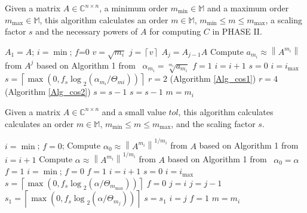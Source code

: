 \begin{algorithm}[!ht]
\caption{Given a matrix $A \in {\mathbb{C}^{n \times n}}$, a minimum order $m_{\min}\in\mathbb{M}$ and a maximum order $m_{\max}\in\mathbb{M}$, this algorithm calculates an order $m\in\mathbb{M}$, $m_{\min}\le m\le m_{\max}$, a scaling factor $s$  and the necessary powers of $A$ for computing $C$ in PHASE II.}
\label{ms-2}
\begin{algorithmic} [1]
\State $A_1=A$; $i=\min$; $f$=0
    \State $v=\sqrt {m_{i}}$
    \State $j=\left\lceil v\right\rceil$
        \State $A_j=A_{j-1}A$ 
    \EndIf
    \State Compute ${a_{m_{i}}} \approx {\left\| {{A^{m_i}}} \right\|}$ from $A^{j}$  \Comment based on Algorithm 1  from~\cite{High88} 
    \State ${\alpha _{{m_i}}} = \sqrt[{{m_i}}]{{{a_{{m_i}}}}}$
        \State $f=1$ 
    \Else
         \State $i=i+1$
    \EndIf
\EndWhile
{}
    \State $s=0$
\Else
    \State $i=i_{\max}$
    \State $s = \left\lceil {\max \left( {0,{{f_s\log }_2}({\alpha_{m_{i}}}/{\Theta_{mi}})} \right)} \right\rceil $ 
 \Comment $r=2$ (Algorithm \ref{Alg_cos1})
 \State \Comment  $r=4$ (Algorithm \ref{Alg_cos2}) 
    \State $s=s-1$
       \State $s=s-1$
    \EndIf 
\EndIf
\EndIf
\State $m=m_i$    
\end{algorithmic}
\end{algorithm}

\begin{algorithm}[!ht]
\caption{Given a matrix $A \in {\mathbb{C}^{n \times n}}$ and a  small value $tol$, this algorithm calculates  calculates an order $m\in\mathbb{M}$, $m_{\min}\le m\le m_{\max}$, and the scaling factor $s$.}
\label{ms-3}
\begin{algorithmic} [1]
\State $i=\min$; $f=0$; 
\State Compute ${\alpha_0} \approx {\left\| {{A^{m_{i}}}} \right\|^{1/m_{i}}}$ from $A$  \Comment based on Algorithm 1  from~\cite{High88}
    \State $i=i+1$ 
    \State Compute ${\alpha} \approx {\left\| {{A^{m_{i}}}} \right\|^{1/m_{i}}}$ from $A$  \Comment based on Algorithm 1  from~\cite{High88}
        \State $\alpha_0=\alpha$ 
    \Else
        \State $f=1$
    \EndIf
\EndWhile
\State  $i=\min$; $f=0$ 
        \State $f=1$
    \Else
        \State $i=i+1$
    \EndIf
\EndWhile
{}
    \State $s=0$
\Else
    \State $i=i_{\max}$
    \State $s = \left\lceil {\max \left( {0,{{f_{s}\log }_2}({\alpha}/{\Theta_{m_{\max}}})} \right)} \right\rceil $ 
    \State $f=0$
    \State $j=i$
       \State $j=j-1$
       \State $s_1 = \left\lceil {\max \left( {0,{{f_{s}\log }_2}({\alpha }/{\Theta_{m_{j}}})} \right)} \right\rceil $
            \State $s=s_1$
            \State $i=j$
       \Else 
            \State $f=1$  
       \EndIf 
    \EndWhile   
\EndIf
\State $m=m_i$    
\end{algorithmic}
\end{algorithm}



